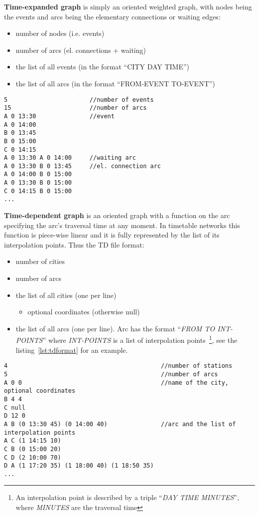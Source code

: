 \noindent \textbf{Time-expanded graph} is simply an oriented weighted graph, with nodes being the events and arcs being the elementary connections or waiting edges:
\begin{itemize}
	\item number of nodes (i.e. events)
	\item number of arcs (el. connections + waiting)
	\item the list of all events (in the format ``CITY DAY TIME'')
	\item the list of all arcs (in the format ``FROM-EVENT TO-EVENT'')
\end{itemize}
\hspace*{\fill}

\begin{lstlisting}[caption={TE file format.}]
5                       //number of events
15                      //number of arcs
A 0 13:30               //event
A 0 14:00
B 0 13:45
B 0 15:00
C 0 14:15
A 0 13:30 A 0 14:00     //waiting arc
A 0 13:30 B 0 13:45     //el. connection arc
A 0 14:00 B 0 15:00
A 0 13:30 B 0 15:00
C 0 14:15 B 0 15:00
...
\end{lstlisting}

\noindent \textbf{Time-dependent graph} is an oriented graph with a function on the arc specifying the arc's traversal time at any moment. In timetable networks this function is piece-wise linear and it is fully represented by the list of its interpolation points. Thus the TD file format:
\begin{itemize}
	\item number of cities
	\item number of arcs
	\item the list of all cities  (one per line)
	\begin{itemize}
		\item optional coordinates (otherwise null)
	\end{itemize}
	\item the list of all arcs (one per line). Arc has the format ``\textit{FROM TO INT-POINTS}'' where \textit{INT-POINTS} is a list of interpolation points~\footnote{An interpolation point is described by a triple ``\textit{DAY TIME MINUTES}'', where \textit{MINUTES} are the traversal time}, see the listing~\ref{lst:tdformat} for an example.
\end{itemize}
\hspace*{\fill}

\begin{lstlisting}[caption={TD file format.}, label={lst:tdformat}]
4                                           //number of stations
5                                           //number of arcs
A 0 0                                       //name of the city, optional coordinates
B 4 4
C null
D 12 0
A B (0 13:30 45) (0 14:00 40)               //arc and the list of interpolation points
A C (1 14:15 10)
C B (0 15:00 20)
C D (2 10:00 70)
D A (1 17:20 35) (1 18:00 40) (1 18:50 35)
...
\end{lstlisting}